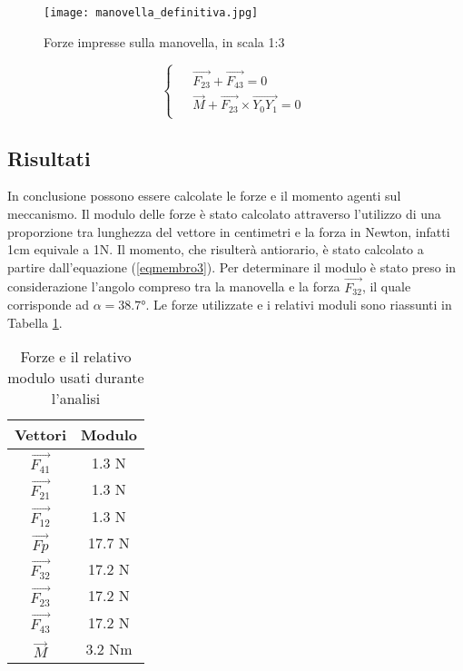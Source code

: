 \documentclass{article}
\begin{document}
\begin{figure} [h!]
    \centering
    \texttt{[image: manovella\_definitiva.jpg]}
    \caption{Forze impresse sulla manovella, in scala 1:3}
    \label{manovella}
\end{figure}

\begin{equation}
\begin{cases}
    \begin{aligned}
        &\Vec{F_{23}} + \Vec{F_{43}} = 0 \\
        &\Vec{M} + \Vec{F_{23}} \times \Vec{Y_0Y_1} = 0
    \end{aligned}
\end{cases}
\label{eqmembro3}
\end{equation}
\newpage
\subsection{Risultati}
In conclusione possono essere calcolate le forze e il momento agenti sul meccanismo. Il modulo delle forze è stato calcolato attraverso l'utilizzo di una proporzione tra lunghezza del vettore in centimetri e la forza in Newton, infatti 1cm equivale a 1N. Il momento, che risulterà antiorario, è stato calcolato a partire dall'equazione (\ref{eqmembro3}). Per determinare il modulo è stato preso in considerazione l'angolo compreso tra la manovella e la forza $\Vec{F_{32}}$, il quale corrisponde ad $\alpha=38.7\si{\degree}$. Le forze utilizzate e i relativi moduli sono riassunti in Tabella \ref{analisi}.

\begin{table} [h!]
    \centering
    \begin{tabular}{c|c}
    \hline
       Vettori & Modulo \\
    \hline
       $\Vec{F_{41}}$ & 1.3 N \\
    \hline
       $\vec{F_{21}}$ & 1.3 N \\
    \hline
       $\Vec{F_{12}}$ & 1.3 N \\
    \hline
       $\Vec{Fp}$ & 17.7 N \\
    \hline
       $\Vec{F_{32}}$ & 17.2 N \\
    \hline
       $\Vec{F_{23}}$ & 17.2 N \\
    \hline
       $\Vec{F_{43}}$ & 17.2 N \\
    \hline
       $\Vec{M}$ & 3.2 Nm \\
    \hline
    \end{tabular}
    \caption{Forze e il relativo modulo usati durante l'analisi}
    \label{analisi}
\end{table}
\end{document}
